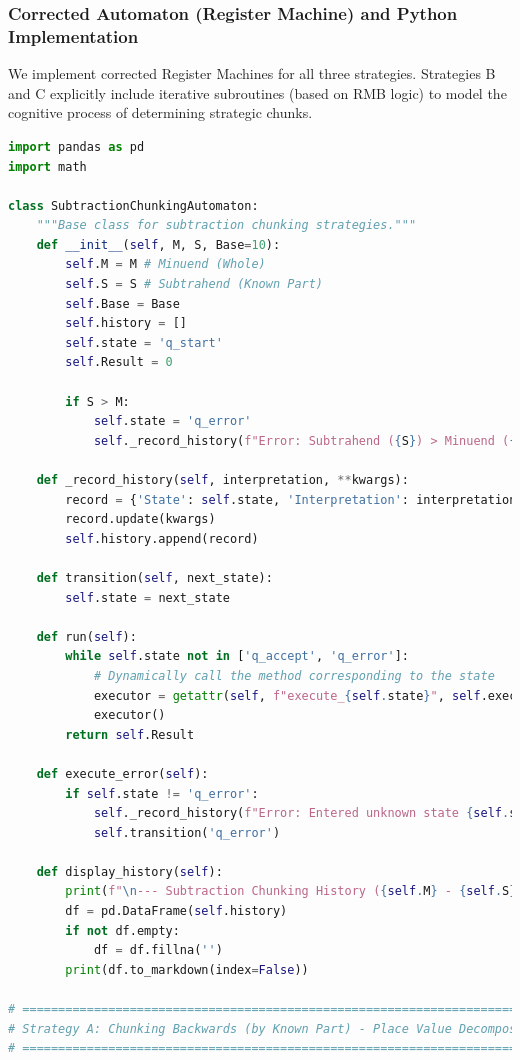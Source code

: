 \documentclass[11pt]{article}
\begin{document}
\subsubsection*{Corrected Automaton (Register Machine) and Python Implementation}

We implement corrected Register Machines for all three strategies. Strategies B and C explicitly include iterative subroutines (based on RMB logic) to model the cognitive process of determining strategic chunks.

\begin{lstlisting}[language=Python]
import pandas as pd
import math

class SubtractionChunkingAutomaton:
    """Base class for subtraction chunking strategies."""
    def __init__(self, M, S, Base=10):
        self.M = M # Minuend (Whole)
        self.S = S # Subtrahend (Known Part)
        self.Base = Base
        self.history = []
        self.state = 'q_start'
        self.Result = 0

        if S > M:
            self.state = 'q_error'
            self._record_history(f"Error: Subtrahend ({S}) > Minuend ({M}).")

    def _record_history(self, interpretation, **kwargs):
        record = {'State': self.state, 'Interpretation': interpretation}
        record.update(kwargs)
        self.history.append(record)

    def transition(self, next_state):
        self.state = next_state

    def run(self):
        while self.state not in ['q_accept', 'q_error']:
            # Dynamically call the method corresponding to the state
            executor = getattr(self, f"execute_{self.state}", self.execute_error)
            executor()
        return self.Result

    def execute_error(self):
        if self.state != 'q_error':
            self._record_history(f"Error: Entered unknown state {self.state}")
            self.transition('q_error')

    def display_history(self):
        print(f"\n--- Subtraction Chunking History ({self.M} - {self.S}) | Strategy: {self.strategy_name} ---")
        df = pd.DataFrame(self.history)
        if not df.empty:
            df = df.fillna('')
        print(df.to_markdown(index=False))

# =============================================================================
# Strategy A: Chunking Backwards (by Known Part) - Place Value Decomposition
# =============================================================================


\end{lstlisting}
\end{document}
